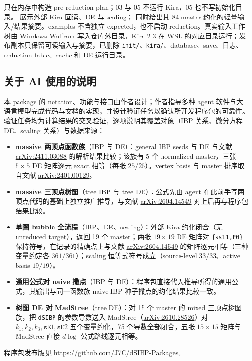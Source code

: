﻿\documentclass[a4paper,11pt]{article}
\begin{document}
 只在内存中构造 pre-reduction plan；03 与 05 不运行 Kira，05 也不写初始化目录。 展示外部 Kira 回读、DE 与 scaling； 同时给出其 84-master 约化的轻量输入/结果摘要。examples 不含独立 expected，也不启动 reduction。真实输入工作树由 Windows Wolfram 写入仓库外目录，Kira 2.3 在 WSL 的对应目录运行；发布副本只保留可读输入与摘要，已删除 \texttt{init/}、\texttt{kira/}、database、save、日志、reduction table、cache 和 DE 运行目录。

\subsection*{关于 AI 使用的说明}
本 package 的 notation、功能与接口由作者设计；作者指导多种 agent 软件与大语言模型完成代码与文档的实现，并设计验证任务以确认所开发程序包的可靠性。验证任务均为计算结果的交叉验证，逐项说明其覆盖对象（IBP 关系、微分方程 DE、scaling 关系）与数据来源：
\begin{itemize}
  \item \textbf{massive 两顶点函数族}（IBP 与 DE）：general IBP seeds 与 DE 与文献
    \href{https://arxiv.org/abs/2411.03088}{arXiv:2411.03088} 的解析结果比较；该族有 5 个 normalized master，三张 $5\times5$ DE 矩阵逐元 exact 相等（每张 $25/25$）。vertex basis 与 master 排序取自文献
    \href{https://arxiv.org/abs/2401.00129}{arXiv:2401.00129}。
  \item \textbf{massive 三顶点树图}（tree IBP 与 tree DE）：公式先由 agent 在此前手写两顶点代码的基础上独立推广推导，与文献
    \href{https://arxiv.org/abs/2604.14549}{arXiv:2604.14549} 对上后再与程序包结果比较。
  \item \textbf{单圈 bubble 全流程}（IBP、DE、scaling）：外部 Kira 约化闭合（无 unreduced target），返回 19 个 master；两张 $19\times19$ DE 矩阵对 \texttt{\{ss11,P0\}} 保持符号，在记录的精确点上与文献
    \href{https://arxiv.org/abs/2604.14549}{arXiv:2604.14549} 的矩阵逐元相等（三种变量约定各 $361/361$）；scaling 恒等式符号成立（source-level $33/33$、active basis $19/19$）。
  \item \textbf{通用公式对 naive 撒点}（IBP 与 DE）：程序包直接代入推导所得的通用公式，其输出与同一函数族 naive IBP 种子撒点的约化结果比较一致。
  \item \textbf{树图 DE 对 MadStree}（tree DE）：对 15 个 master 的 mixed 三顶点树图族，把 \texttt{dSIBP} 的参数导数送入 MadStree（\href{https://arxiv.org/abs/2610.28526}{arXiv:2610.28526}）对 $k_1,k_2,k_3,\texttt{sE}1,\texttt{sE}2$ 五个变量约化，75 个导数全部闭合，五张 $15\times15$ 矩阵与 MadStree 直接 $d\log$ 公式路线逐元相等。
\end{itemize}
程序包发布版见 \url{https://github.com/J7C/dSIBP-Packages}。
\end{document}
